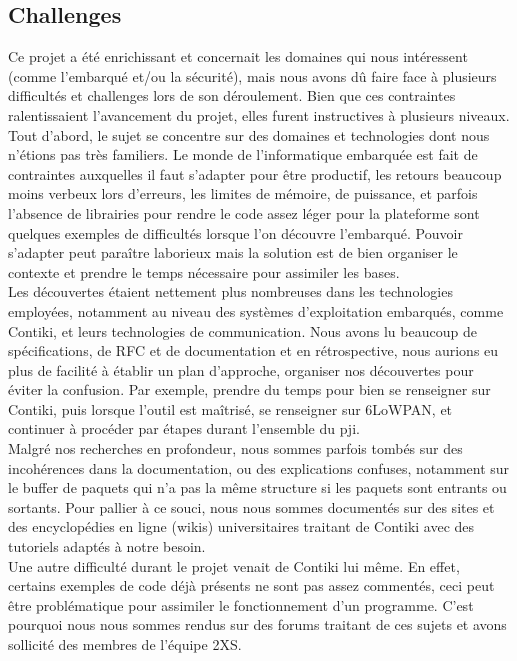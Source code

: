 	\subsection{Challenges} %
	 Ce projet a été enrichissant et concernait les domaines qui nous intéressent (comme l'embarqué et/ou la sécurité), mais nous avons dû faire face à plusieurs difficultés et challenges lors de son déroulement. Bien que ces contraintes ralentissaient l'avancement du projet, elles furent instructives à plusieurs niveaux.\\
	 Tout d'abord, le sujet se concentre sur des domaines et technologies dont nous n'étions pas très familiers. Le monde de l'informatique embarquée est fait de contraintes auxquelles il faut s'adapter pour être productif, les retours beaucoup moins verbeux lors d'erreurs, les limites de mémoire, de puissance, et parfois l'absence de librairies pour rendre le code assez léger pour la plateforme sont quelques exemples de difficultés lorsque l'on découvre l'embarqué. Pouvoir s'adapter peut paraître laborieux mais la solution est de bien organiser le contexte et prendre le temps nécessaire pour assimiler les bases.\\
	 
	 Les découvertes étaient nettement plus nombreuses dans les technologies employées, notamment au niveau des systèmes d'exploitation embarqués, comme Contiki, et leurs technologies de communication. Nous avons lu beaucoup de spécifications, de RFC et de documentation et en rétrospective, nous aurions eu plus de facilité à établir un plan d'approche, organiser nos découvertes pour éviter la confusion. Par exemple, prendre du temps pour bien se renseigner sur Contiki, puis lorsque l'outil est maîtrisé, se renseigner sur 6LoWPAN, et continuer à procéder par étapes durant l'ensemble du pji.\\
	 Malgré nos recherches en profondeur, nous sommes parfois tombés sur des incohérences dans la documentation, ou des explications confuses, notamment sur le buffer de paquets qui n'a pas la même structure si les paquets sont entrants ou sortants. Pour pallier à ce souci, nous nous sommes documentés sur des sites et des encyclopédies en ligne (wikis) universitaires traitant de Contiki avec des tutoriels adaptés à notre besoin.\\
	 
	 Une autre difficulté durant le projet venait de Contiki lui même. En effet, certains exemples de code déjà présents ne sont pas assez commentés, ceci peut être problématique pour assimiler le fonctionnement d'un programme. C'est pourquoi nous nous sommes rendus sur des forums traitant de ces sujets et avons sollicité des membres de l'équipe 2XS.

